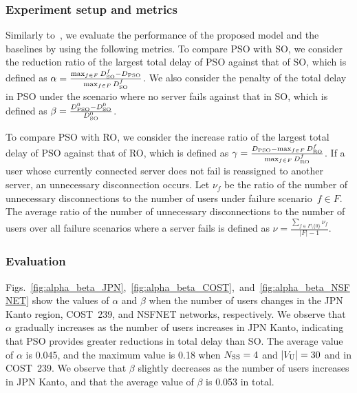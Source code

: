 \documentclass[10pt, letterpaper]{IEEEtran}
\begin{document}
\begin{CJK}{UTF8}{ipxm}
\subsubsection{Experiment setup and metrics}
  Similarly to~\cite{5_9_13_Kamrul2010, 5_9_Masuda2020}, we evaluate the performance of the proposed model and the baselines by using the following metrics.
  To compare PSO with SO, we consider the reduction ratio of the largest total delay of PSO against that of SO, which is defined as 
  $\alpha = \frac{\max_{f \in F}D^f_{\rm SO} - D_{\rm PSO}}{\max_{f \in F}D^f_{\rm SO}}$.
  We also consider the penalty of the total delay in PSO under the scenario where no server fails against that in SO, which is defined as
  $\beta = \frac{D^0_{\rm PSO} - D^0_{\rm SO}}{D^0_{\rm SO}}$.

  To compare PSO with RO, we consider the increase ratio of the largest total delay of PSO against that of RO, which is defined as
  $\gamma = \frac{D_{\rm PSO} - \max_{f \in F}D^f_{\rm RO}}{\max_{f \in F}D^f_{\rm RO}}$.
  If a user whose currently connected server does not fail is reassigned to another server, an unnecessary disconnection occurs.
  Let $\nu_f$ be the ratio of the number of unnecessary disconnections to the number of users under failure scenario~$f \in F$.
  The average ratio of the number of unnecessary disconnections to the number of users over all failure scenarios where a server fails is defined as 
  $\nu = \frac{\sum_{f \in F \setminus \{0\}}\nu_f}{|F| - 1}$.

\subsubsection{Evaluation}
Figs.~\ref{fig:alpha_beta_JPN},~\ref{fig:alpha_beta_COST},~and~\ref{fig:alpha_beta_NSFNET} show the values of $\alpha$ and $\beta$ when the number of users changes in the JPN Kanto region, COST~239, and NSFNET networks, respectively.
We observe that $\alpha$ gradually increases as the number of users increases in JPN Kanto, indicating that PSO provides greater reductions in total delay than SO.
The average value of $\alpha$ is 0.045, and the maximum value is 0.18 when $N_{\rm{SS}}=4$ and $|V_{\rm U}| = 30$ and  in COST~239.
We observe that $\beta$ slightly decreases as the number of users increases in JPN Kanto, and that the average value of $\beta$ is 0.053 in total.


\end{CJK}
\end{document}
